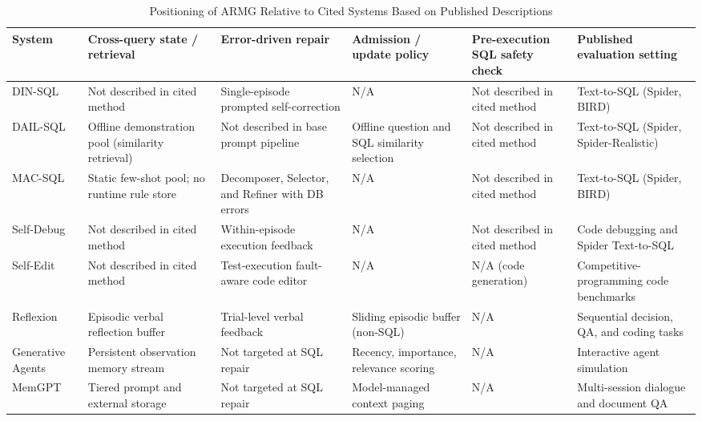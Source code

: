 \begin{table}[t]
\centering
\caption{Positioning of ARMG Relative to Cited Systems Based on Published Descriptions}
\label{tab:positioning}
\footnotesize
\setlength{\tabcolsep}{3.5pt}
\renewcommand{\arraystretch}{1.05}
\begin{tabularx}{\textwidth}{@{}>{\raggedright\arraybackslash}p{2.2cm} >{\raggedright\arraybackslash}p{2.5cm} >{\raggedright\arraybackslash}p{2.5cm} >{\raggedright\arraybackslash}p{2.8cm} >{\raggedright\arraybackslash}p{2.5cm} >{\raggedright\arraybackslash}X@{}}
\toprule
\textbf{System} & \textbf{Cross-query state / retrieval} & \textbf{Error-driven repair} & \textbf{Admission / update policy} & \textbf{Pre-execution SQL safety check} & \textbf{Published evaluation setting} \\
\midrule
DIN-SQL \cite{pourreza2023dinsql} & Not described in cited method & Single-episode prompted self-correction & N/A & Not described in cited method & Text-to-SQL (Spider, BIRD) \\
DAIL-SQL \cite{gao2024dailsql} & Offline demonstration pool (similarity retrieval) & Not described in base prompt pipeline & Offline question and SQL similarity selection & Not described in cited method & Text-to-SQL (Spider, Spider-Realistic) \\
MAC-SQL \cite{wang2025macsql} & Static few-shot pool; no runtime rule store & Decomposer, Selector, and Refiner with DB errors & N/A & Not described in cited method & Text-to-SQL (Spider, BIRD) \\
Self-Debug \cite{chen2024selfdebug} & Not described in cited method & Within-episode execution feedback & N/A & Not described in cited method & Code debugging and Spider Text-to-SQL \\
Self-Edit \cite{zhang2023selfedit} & Not described in cited method & Test-execution fault-aware code editor & N/A & N/A (code generation) & Competitive-programming code benchmarks \\
Reflexion \cite{shinn2023reflexion} & Episodic verbal reflection buffer & Trial-level verbal feedback & Sliding episodic buffer (non-SQL) & N/A & Sequential decision, QA, and coding tasks \\
Generative Agents \cite{park2023generativeagents} & Persistent observation memory stream & Not targeted at SQL repair & Recency, importance, relevance scoring & N/A & Interactive agent simulation \\
MemGPT \cite{packer2023memgpt} & Tiered prompt and external storage & Not targeted at SQL repair & Model-managed context paging & N/A & Multi-session dialogue and document QA \\

\end{tabularx}
\end{table}
